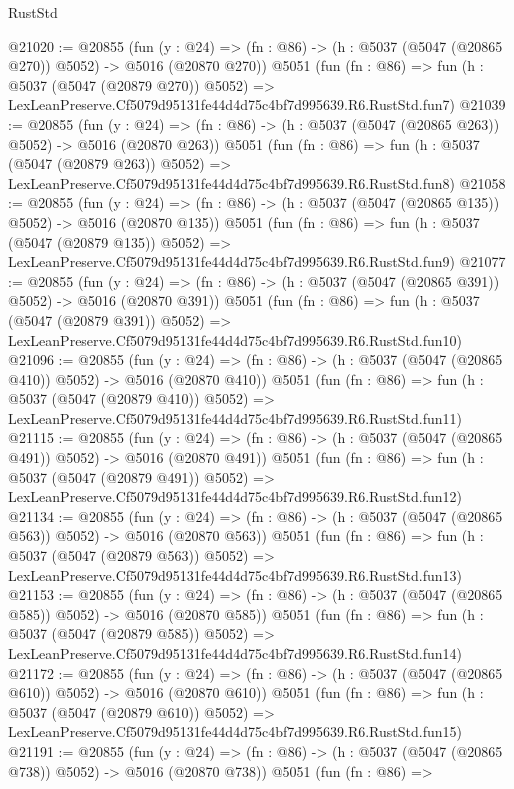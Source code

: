 \begin{lexlean}{RustStd}
\begin{coremodule}
@21020 := @20855
    (fun (y : @24) => (fn : @86) -> (h : @5037 (@5047 (@20865 @270)) @5052) -> @5016 (@20870 @270))
    @5051
    (fun (fn : @86) =>
    fun (h : @5037 (@5047 (@20879 @270)) @5052) =>
    LexLeanPreserve.Cf5079d95131fe44d4d75c4bf7d995639.R6.RustStd.fun7)
@21039 := @20855
    (fun (y : @24) => (fn : @86) -> (h : @5037 (@5047 (@20865 @263)) @5052) -> @5016 (@20870 @263))
    @5051
    (fun (fn : @86) =>
    fun (h : @5037 (@5047 (@20879 @263)) @5052) =>
    LexLeanPreserve.Cf5079d95131fe44d4d75c4bf7d995639.R6.RustStd.fun8)
@21058 := @20855
    (fun (y : @24) => (fn : @86) -> (h : @5037 (@5047 (@20865 @135)) @5052) -> @5016 (@20870 @135))
    @5051
    (fun (fn : @86) =>
    fun (h : @5037 (@5047 (@20879 @135)) @5052) =>
    LexLeanPreserve.Cf5079d95131fe44d4d75c4bf7d995639.R6.RustStd.fun9)
@21077 := @20855
    (fun (y : @24) => (fn : @86) -> (h : @5037 (@5047 (@20865 @391)) @5052) -> @5016 (@20870 @391))
    @5051
    (fun (fn : @86) =>
    fun (h : @5037 (@5047 (@20879 @391)) @5052) =>
    LexLeanPreserve.Cf5079d95131fe44d4d75c4bf7d995639.R6.RustStd.fun10)
@21096 := @20855
    (fun (y : @24) => (fn : @86) -> (h : @5037 (@5047 (@20865 @410)) @5052) -> @5016 (@20870 @410))
    @5051
    (fun (fn : @86) =>
    fun (h : @5037 (@5047 (@20879 @410)) @5052) =>
    LexLeanPreserve.Cf5079d95131fe44d4d75c4bf7d995639.R6.RustStd.fun11)
@21115 := @20855
    (fun (y : @24) => (fn : @86) -> (h : @5037 (@5047 (@20865 @491)) @5052) -> @5016 (@20870 @491))
    @5051
    (fun (fn : @86) =>
    fun (h : @5037 (@5047 (@20879 @491)) @5052) =>
    LexLeanPreserve.Cf5079d95131fe44d4d75c4bf7d995639.R6.RustStd.fun12)
@21134 := @20855
    (fun (y : @24) => (fn : @86) -> (h : @5037 (@5047 (@20865 @563)) @5052) -> @5016 (@20870 @563))
    @5051
    (fun (fn : @86) =>
    fun (h : @5037 (@5047 (@20879 @563)) @5052) =>
    LexLeanPreserve.Cf5079d95131fe44d4d75c4bf7d995639.R6.RustStd.fun13)
@21153 := @20855
    (fun (y : @24) => (fn : @86) -> (h : @5037 (@5047 (@20865 @585)) @5052) -> @5016 (@20870 @585))
    @5051
    (fun (fn : @86) =>
    fun (h : @5037 (@5047 (@20879 @585)) @5052) =>
    LexLeanPreserve.Cf5079d95131fe44d4d75c4bf7d995639.R6.RustStd.fun14)
@21172 := @20855
    (fun (y : @24) => (fn : @86) -> (h : @5037 (@5047 (@20865 @610)) @5052) -> @5016 (@20870 @610))
    @5051
    (fun (fn : @86) =>
    fun (h : @5037 (@5047 (@20879 @610)) @5052) =>
    LexLeanPreserve.Cf5079d95131fe44d4d75c4bf7d995639.R6.RustStd.fun15)
@21191 := @20855
    (fun (y : @24) => (fn : @86) -> (h : @5037 (@5047 (@20865 @738)) @5052) -> @5016 (@20870 @738))
    @5051
    (fun (fn : @86) =>

\end{coremodule}
\end{lexlean}
